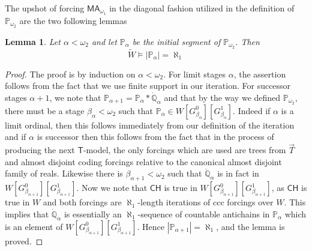 \documentclass[a4paper,12pt]{article}
\newtheorem{lemma}[theorem]{Lemma}
\newcommand{\forceP}{\mathbb{P}}
\newcommand{\forceQ}{\mathbb{Q}}
\newcommand{\CH}{\mathsf{CH}}
\newcommand{\MA}{\mathsf{MA}_{\omega_1}}
\newcommand{\T}{\mathsf{T}}
\begin{document}
The upshot of forcing $\MA$ in the diagonal fashion utilized in the definition of $\forceP_{\omega_2}$ are the two following lemmas
\begin{lemma}
Let $\alpha < \omega_2$ and let $\forceP_{\alpha}$ be the initial segment of $\forceP_{\omega_2}$. Then
\[\tilde{W} \models |\forceP_{\alpha}| = \aleph_1 \]
\end{lemma}
\begin{proof}
The proof is by induction on $\alpha < \omega_2$.
For limit stages $\alpha$, the assertion follows from the fact that we use finite support in our iteration. For successor stages $\alpha+1$, we note that $\forceP_{\alpha+1}=\forceP_{\alpha} \ast \dot{\forceQ}_{\alpha}$ and that by the way we defined $\forceP_{\omega_2}$, there must be a stage $\beta_{\alpha} < \omega_2$ such that $\forceP_{\alpha} \in W[G^0_{\beta_{\alpha}}][G^1_{\beta_{\alpha}}]$. Indeed if $\alpha$ is a limit ordinal, then this follows immediately from our definition of the iteration and if $\alpha$ is successor then this follows from the fact that in the process of producing the next $\T$-model, the only forcings which are used are trees from $\vec{T}$ and almost disjoint coding forcings relative to the canonical almost disjoint family of reals. Likewise there is $\beta_{\alpha+1} < \omega_2$ such that $\dot{\forceQ}_{\alpha}$ is in fact in $W[G^0_{\beta_{\alpha+1}}] [G^1_{\beta_{\alpha+1}}]$.
Now we note that $\CH$ is true in $W[G^0_{\beta_{\alpha+1}}] [G^1_{\beta_{\alpha+1}}]$, as $\CH$ is true in $W$ and both forcings are $\aleph_1$-length iterations of ccc forcings over $W$. This implies that $\dot{\forceQ}_{\alpha}$ is essentially an $\aleph_1$-sequence of  countable antichains in $\forceP_{\alpha}$ which is an element of $W[G^0_{\beta_{\alpha+1}}] [G^1_{\beta_{\alpha+1}}]$.
Hence $|\forceP_{\alpha+1}| = \aleph_1$, and the lemma is proved.
\end{proof}
\end{document}
